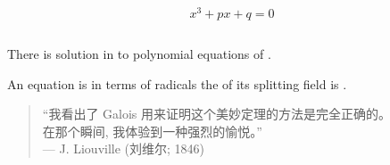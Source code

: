 \begin{frame}{}
  \[
    x^3 + px + q = 0
  \]

  \begin{columns}
      \begin{center}
      \end{center}
  \end{columns}
\end{frame}

\begin{frame}{}
\end{frame}

\begin{frame}{}
  \begin{theorem}
    There is  solution in  to
    polynomial equations of .
  \end{theorem}

  \pause
  \vspace{0.30cm}
  \begin{center}
  \end{center}
\end{frame}

\begin{frame}
  \begin{theorem}
    An equation is  in terms of radicals 
    the  of its splitting field is .
  \end{theorem}
\end{frame}

\begin{frame}

  \begin{center}
  \end{center}
\end{frame}

\begin{frame}
  \begin{quote}
  \begin{center}
    ``我看出了 Galois 用来证明这个美妙定理的方法是完全正确的。\\[8pt]
    在那个瞬间, 我体验到一种强烈的愉悦。'' \\[15pt]

    \hfill --- J. Liouville (刘维尔; 1846)
  \end{center}
\end{quote}
\end{frame}
